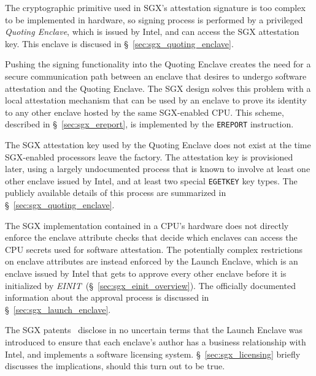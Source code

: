 The cryptographic primitive used in SGX's attestation signature is too complex
to be implemented in hardware, so signing process is performed by a privileged
\textit{Quoting Enclave}, which is issued by Intel, and can access the SGX
attestation key. This enclave is discused in \S~\ref{sec:sgx_quoting_enclave}.

Pushing the signing functionality into the Quoting Enclave creates the need for
a secure communication path between an enclave that desires to undergo
software attestation and the Quoting Enclave. The SGX design solves this
problem with a local attestation mechanism that can be used by an enclave to
prove its identity to any other enclave hosted by the same SGX-enabled CPU.
This scheme, described in \S~\ref{sec:sgx_ereport}, is implemented by the
\texttt{EREPORT} instruction.


The SGX attestation key used by the Quoting Enclave does not exist at the time
SGX-enabled processors leave the factory. The attestation key is provisioned
later, using a largely undocumented process that is known to involve at least
one other enclave issued by Intel, and at least two special \texttt{EGETKEY}
key types. The publicly available details of this process are summarized in
\S~\ref{sec:sgx_quoting_enclave}.

The SGX implementation contained in a CPU's hardware does not directly enforce
the enclave attribute checks that decide which enclaves can access the CPU
secrets used for software attestation. The potentially complex restrictions on
enclave attributes are instead enforced by the Launch Enclave, which is an
enclave issued by Intel that gets to approve every other enclave before it is
initialized by \textit{EINIT}~(\S~\ref{sec:sgx_einit_overview}). The officially
documented information about the approval process is discussed in
\S~\ref{sec:sgx_launch_enclave}.


The SGX patents~\cite{intel2013patent1, intel2013patent2} disclose in no
uncertain terms that the Launch Enclave was introduced to ensure that each
enclave's author has a business relationship with Intel, and implements a
software licensing system. \S~\ref{sec:sgx_licensing} briefly discusses the
implications, should this turn out to be true.


